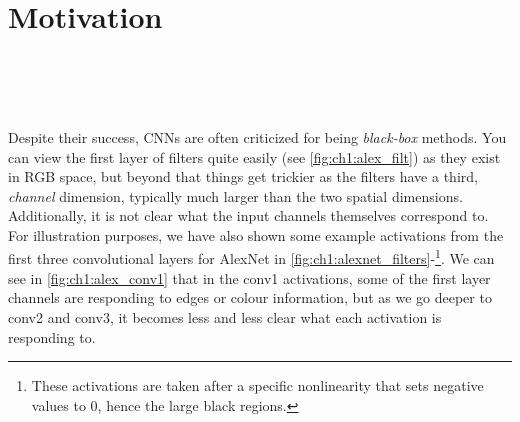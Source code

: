 \section{Motivation}\label{sec:ch1:motivation}
\begin{figure}
  \centering
  \\
  \\
  \\
  \label{fig:ch1:alexnet_filters}
\end{figure}

Despite their success, CNNs are often criticized for being \emph{black-box}
methods. You can view the first layer of filters
quite easily (see \autoref{fig:ch1:alex_filt}) as they exist in RGB
space, but beyond that things get trickier as the filters have a third, \emph{channel}
dimension, typically much larger than the two spatial dimensions. Additionally,
it is not clear what the input channels themselves correspond to. For illustration
purposes, we have also shown some example activations from the first three
convolutional layers for AlexNet in
\autoref{fig:ch1:alexnet_filters}-\footnote{These activations are
taken after a specific nonlinearity that sets negative values to 0, hence the
large black regions.}. We can see in \autoref{fig:ch1:alex_conv1} that
in the conv1 activations, some of the first layer channels are responding to
edges or colour information, but as we go deeper to conv2 and conv3, it becomes
less and less clear what each activation is responding to.

